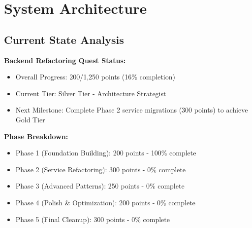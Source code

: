 \documentclass[10pt]{article}
\begin{document}
\section{System Architecture}

\subsection{Current State Analysis}

\textbf{Backend Refactoring Quest Status:}
\begin{itemize}
    \item Overall Progress: 200/1,250 points (16\% completion)
    \item Current Tier: Silver Tier - Architecture Strategist
    \item Next Milestone: Complete Phase 2 service migrations (300 points) to achieve Gold Tier
\end{itemize}

\textbf{Phase Breakdown:}
\begin{itemize}
    \item Phase 1 (Foundation Building): 200 points - 100\% complete
    \item Phase 2 (Service Refactoring): 300 points - 0\% complete
    \item Phase 3 (Advanced Patterns): 250 points - 0\% complete
    \item Phase 4 (Polish \& Optimization): 200 points - 0\% complete
    \item Phase 5 (Final Cleanup): 300 points - 0\% complete
\end{itemize}
\end{document}
